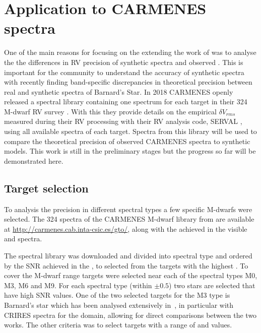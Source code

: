 
\section{Application to {CARMENES} spectra}

One of the main reasons for focusing on the extending the work of\citet{figueira_radial_2016} was to analyse the the differences in {RV} precision of synthetic spectra and observed \nir{}.
This is important for the community to understand the accuracy of synthetic spectra with \citet{artigau_optical_2018} recently finding band-specific discrepancies in theoretical precision between real and synthetic spectra of Barnard's Star.
In 2018 CARMENES openly released a spectral library containing one spectrum for each target in their 324 M-dwarf {RV} survey \citet{reiners_carmenes_2018}.
With this they provide details on the empirical \(\delta V_{rms}\) measured during their {RV} processing with their {RV} analysis code, {SERVAL} \citep{zechmeister_spectrum_2018}, using all available spectra of each target.
Spectra from this library will be used to compare the theoretical precision of observed CARMENES spectra to synthetic models.
This work is still in the preliminary stages but the progress so far will be demonstrated here.


\subsection{Target selection}
To analysis the precision in different spectral types a few specific M-dwarfs were selected.
The 324 spectra of the {CARMENES} M-dwarf library from \citet{reiners_carmenes_2018} are available at \href{http://carmenes.cab.inta-csic.es/gto/}{http://carmenes.cab.inta-csic.es/gto/}, along with the achieved \snr{} in the visible and \nir{} spectra.

The spectral library was downloaded and divided into spectral type and ordered by the {SNR} achieved in the \nir{}, to selected from the targets with the highest \snr{}.
To cover the M-dwarf range targets were selected near each of the spectral types M0, M3, M6 and M9.
For each spectral type (within $\pm0.5$) two stars are selected that have high {SNR} values.
One of the two selected targets for the M3 type is Barnard's star which has been analysed extensively in~\citet{artigau_optical_2018}, in particular with CRIRES spectra for the \nir{} domain, allowing for direct comparisons between the two works.
The other criteria was to select targets with a range of \Logg and \feh{} values.

